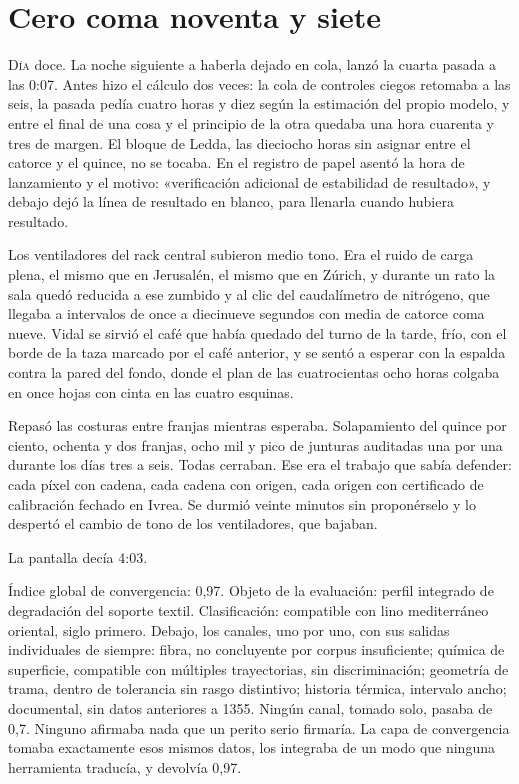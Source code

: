 \clearpage

\chapter{Cero coma noventa y siete}

\lettrine[lines=2, lhang=0.1, nindent=0.2em]{D}{ía} doce. La noche siguiente a haberla dejado en cola, lanzó la cuarta pasada a las 0:07. Antes hizo el cálculo dos veces: la cola de controles ciegos retomaba a las seis, la pasada pedía cuatro horas y diez según la estimación del propio modelo, y entre el final de una cosa y el principio de la otra quedaba una hora cuarenta y tres de margen. El bloque de Ledda, las dieciocho horas sin asignar entre el catorce y el quince, no se tocaba. En el registro de papel asentó la hora de lanzamiento y el motivo: «verificación adicional de estabilidad de resultado», y debajo dejó la línea de resultado en blanco, para llenarla cuando hubiera resultado.


Los ventiladores del rack central subieron medio tono. Era el ruido de carga plena, el mismo que en Jerusalén, el mismo que en Zúrich, y durante un rato la sala quedó reducida a ese zumbido y al clic del caudalímetro de nitrógeno, que llegaba a intervalos de once a diecinueve segundos con media de catorce coma nueve. Vidal se sirvió el café que había quedado del turno de la tarde, frío, con el borde de la taza marcado por el café anterior, y se sentó a esperar con la espalda contra la pared del fondo, donde el plan de las cuatrocientas ocho horas colgaba en once hojas con cinta en las cuatro esquinas.

Repasó las costuras entre franjas mientras esperaba. Solapamiento del quince por ciento, ochenta y dos franjas, ocho mil y pico de junturas auditadas una por una durante los días tres a seis. Todas cerraban. Ese era el trabajo que sabía defender: cada píxel con cadena, cada cadena con origen, cada origen con certificado de calibración fechado en Ivrea. Se durmió veinte minutos sin proponérselo y lo despertó el cambio de tono de los ventiladores, que bajaban.

La pantalla decía 4:03.

Índice global de convergencia: 0,97. Objeto de la evaluación: perfil integrado de degradación del soporte textil. Clasificación: compatible con lino mediterráneo oriental, siglo primero. Debajo, los canales, uno por uno, con sus salidas individuales de siempre: fibra, no concluyente por corpus insuficiente; química de superficie, compatible con múltiples trayectorias, sin discriminación; geometría de trama, dentro de tolerancia sin rasgo distintivo; historia térmica, intervalo ancho; documental, sin datos anteriores a 1355. Ningún canal, tomado solo, pasaba de 0,7. Ninguno afirmaba nada que un perito serio firmaría. La capa de convergencia tomaba exactamente esos mismos datos, los integraba de un modo que ninguna herramienta traducía, y devolvía 0,97.

